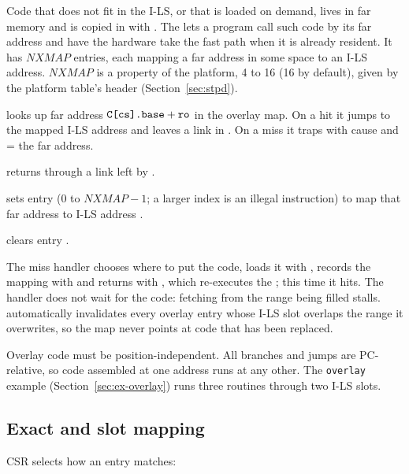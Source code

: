 Code that does not fit in the I-LS, or that is loaded on demand, lives in far memory and is copied in
with . The  lets a program call such code by its far address and have the
hardware take the fast path when it is already resident. It has $\textit{NXMAP}$ entries, each mapping
a far address in some space to an I-LS address. $\textit{NXMAP}$ is a property of the platform, 4 to 16
(16 by default), given by the platform table's header (Section~\ref{sec:stpd}).

\begin{description}[leftmargin=1em,style=nextline]
\item[\insref{xcall} \texttt{rd, cs, ro}] looks up far address $\texttt{C[cs].base} + \texttt{ro}$ in the
  overlay map. On a hit it jumps to the mapped I-LS address and leaves a link in . On a miss it
  traps with cause  and  = the far address.
\item[\insref{xret} \texttt{rs}] returns through a link left by .
\item[\insref{xmap} \texttt{idx, rl, cs, ro}] sets entry  (0 to $\textit{NXMAP}-1$; a
  larger index is an illegal instruction) to map that far address to I-LS address .
\item[\insref{xunmap} \texttt{idx}] clears entry .
\end{description}

The miss handler chooses where to put the code, loads it with , records the mapping with
 and returns with , which re-executes the ; this time it hits. The
handler does not wait for the code: fetching from the range being filled stalls. 
automatically invalidates every overlay entry whose I-LS slot overlaps the range it overwrites, so the
map never points at code that has been replaced.

Overlay code must be position-independent. All \IS branches and jumps are PC-relative, so code
assembled at one address runs at any other. The \texttt{overlay} example (Section~\ref{sec:ex-overlay})
runs three routines through two I-LS slots.

\subsection{Exact and slot mapping}\label{sec:xslot}

CSR  selects how an entry matches:

